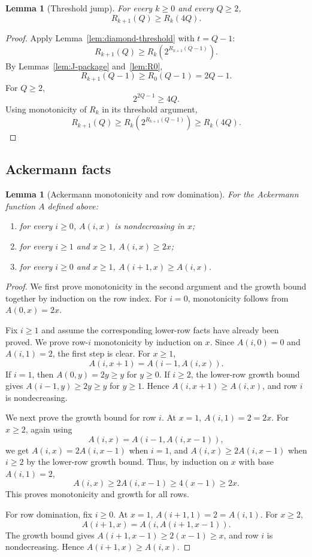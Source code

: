 ﻿\documentclass[11pt]{article}
\newtheorem{lemma}[theorem]{Lemma}
\begin{document}
\begin{lemma}[Threshold jump]\label{lem:threshold-jump}
For every $k\ge0$ and every $Q\ge2$,
\[
R_{k+1}(Q)\ge R_k(4Q).
\]
\end{lemma}

\begin{proof}
Apply Lemma~\ref{lem:diamond-threshold} with $t=Q-1$:
\[
R_{k+1}(Q)\ge R_k(2^{R_{k+1}(Q-1)}).
\]
By Lemmas~\ref{lem:J-package} and~\ref{lem:R0},
\[
R_{k+1}(Q-1)\ge R_0(Q-1)=2Q-1.
\]
For $Q\ge2$,
\[
2^{2Q-1}\ge4Q.
\]
Using monotonicity of $R_k$ in its threshold argument,
\[
R_{k+1}(Q)\ge R_k(2^{R_{k+1}(Q-1)})\ge R_k(4Q).
\]
\end{proof}

\subsection{Ackermann facts}

\begin{lemma}[Ackermann monotonicity and row domination]\label{lem:ackermann-basic}
For the Ackermann function $A$ defined above:
\begin{enumerate}[label=(\roman*)]
\item for every $i\ge0$, $A(i,x)$ is nondecreasing in $x$;
\item for every $i\ge1$ and $x\ge1$, $A(i,x)\ge2x$;
\item for every $i\ge0$ and $x\ge1$, $A(i+1,x)\ge A(i,x)$.
\end{enumerate}
\end{lemma}

\begin{proof}
We first prove monotonicity in the second argument and the growth bound together by induction on the row index.  For $i=0$, monotonicity follows from $A(0,x)=2x$.

Fix $i\ge1$ and assume the corresponding lower-row facts have already been proved.  We prove row-$i$ monotonicity by induction on $x$.  Since $A(i,0)=0$ and $A(i,1)=2$, the first step is clear.  For $x\ge1$,
\[
A(i,x+1)=A(i-1,A(i,x)).
\]
If $i=1$, then $A(0,y)=2y\ge y$ for $y\ge0$.  If $i\ge2$, the lower-row growth bound gives $A(i-1,y)\ge 2y\ge y$ for $y\ge1$.  Hence $A(i,x+1)\ge A(i,x)$, and row $i$ is nondecreasing.

We next prove the growth bound for row $i$.  At $x=1$, $A(i,1)=2=2x$.  For $x\ge2$, again using
\[
A(i,x)=A(i-1,A(i,x-1)),
\]
we get $A(i,x)=2A(i,x-1)$ when $i=1$, and $A(i,x)\ge2A(i,x-1)$ when $i\ge2$ by the lower-row growth bound.  Thus, by induction on $x$ with base $A(i,1)=2$,
\[
A(i,x)\ge2A(i,x-1)\ge4(x-1)\ge2x.
\]
This proves monotonicity and growth for all rows.

For row domination, fix $i\ge0$.  At $x=1$, $A(i+1,1)=2=A(i,1)$.  For $x\ge2$,
\[
A(i+1,x)=A(i,A(i+1,x-1)).
\]
The growth bound gives $A(i+1,x-1)\ge2(x-1)\ge x$, and row $i$ is nondecreasing.  Hence $A(i+1,x)\ge A(i,x)$.
\end{proof}
\end{document}
